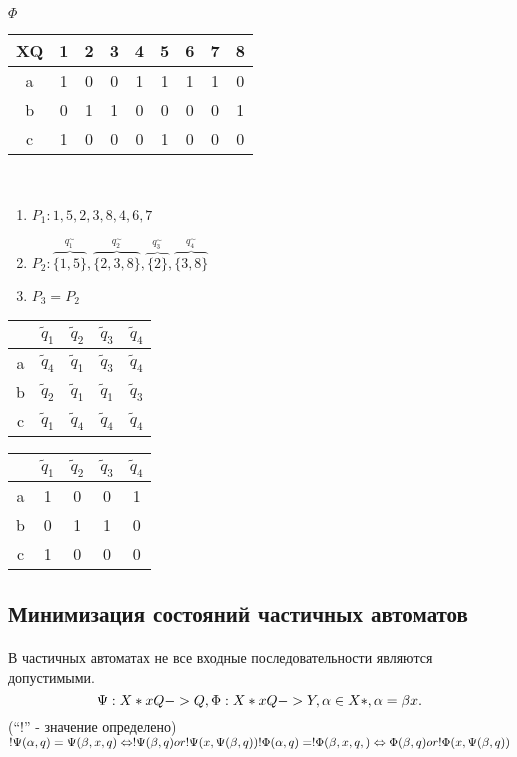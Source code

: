 \documentclass[a5paper,10pt]{article}
\begin{document}
				$\Phi$
				\begin{tabular}{*{9}{c}}
					XQ & 1 & 2 & 3 & 4 & 5 & 6 & 7 & 8 \\
					\hline
					a & 1 & 0 & 0 & 1 & 1 & 1 & 1 & 0 \\
					b & 0 & 1 & 1 & 0 & 0 & 0 & 0 & 1 \\
					c & 1 & 0 & 0 & 0 & 1 & 0 & 0 & 0 \\
				\end{tabular} \\

				\begin{enumerate}
					\item $P_1: {1,5}, {2,3,8}, {4,6,7}$
					\item $P_2: \overbrace{\{1,5\}}^{q^{\sim}_1}, \overbrace{\{2,3,8\}}^{q^{\sim}_2}, \overbrace{\{2\}}^{q^{\sim}_3}, \overbrace{\{3,8\}}^{q^{\sim}_4}$
					\item $P_3=P_2$
				\end{enumerate}

				\begin{tabular}{*{5}{c}}
					& $\tilde q_1$ & $\tilde q_2$ & $\tilde q_3$ & $\tilde q_4$ \\
					\hline
					a & $\tilde q_4$ & $\tilde q_1$ & $\tilde q_3$ & $\tilde q_4$ \\
					b & $\tilde q_2$ & $\tilde q_1$ & $\tilde q_1$ & $\tilde q_3$ \\
					c & $\tilde q_1$ & $\tilde q_4$ & $\tilde q_4$ & $\tilde q_4$ \\
				\end{tabular}

				\begin{tabular}{*{5}{c}}
					& $\tilde q_1$ & $\tilde q_2$ & $\tilde q_3$ & $\tilde q_4$ \\
					\hline
					a & 1 & 0 & 0 & 1 \\
					b & 0 & 1 & 1 & 0 \\
					c & 1 & 0 & 0 & 0 \\
				\end{tabular}

		\subsection{Минимизация состояний частичных автоматов}
			\paragraph{}
				В частичных автоматах не все входные последовательности являются допустимыми.
				\begin{equation}
					\Psi: X*xQ->Q, \\
					\Phi: X*xQ->Y, \\
					\alpha \in X*, \alpha=\beta x. \\
				\end{equation}
				(``!'' - значение определено)
				$!\Psi(\alpha,q)=\Psi(\beta,x,q) \Leftrightarrow !\Psi(\beta,q) or !\Psi(x,\Psi(\beta,q)) \\
				!\Phi(\alpha,q)=!\Phi(\beta,x,q,) \Leftrightarrow \Phi(\beta,q) or !\Phi(x,\Psi(\beta,q))$
\end{document}
